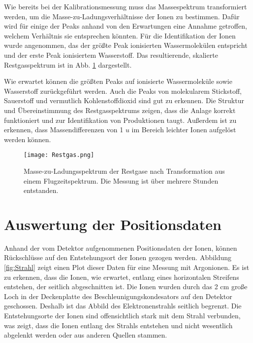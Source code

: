 Wie bereits bei der Kalibrationsmessung muss das Massespektrum transformiert werden, um die Masse-zu-Ladungsverhältnisse der Ionen zu bestimmen. Dafür wird für einige der Peaks anhand von den Erwartungen eine Annahme getroffen, welchem Verhältnis sie entsprechen könnten. Für die Identifikation der Ionen wurde angenommen, das der größte Peak ionisierten Wassermolekülen
entspricht und der erste Peak ionisiertem Wasserstoff. Das resultierende, skalierte Restgasspektrum ist in Abb. \ref{fig:rest} dargestellt.

Wie erwartet können die größten Peaks auf ionisierte Wassermoleküle sowie Wasserstoff zurückgeführt werden. Auch die Peaks von molekularem Stickstoff, Sauerstoff und vermutlich Kohlenstoffdioxid sind gut zu erkennen. Die Struktur und Übereinstimmung des Restgasspektrums zeigen, dass die Anlage korrekt funktioniert und zur Identifikation von Produktionen taugt. Außerdem ist zu erkennen, dass Massendifferenzen von 1 $u$ im Bereich leichter Ionen aufgelöst werden können. 

\begin{figure}[h]
    \centering
    \hspace*{-1cm}
    \texttt{[image: Restgas.png]}
    \caption[Masse-zu-Ladungsspektrum der Restgase]{Masse-zu-Ladungsspektrum der Restgase nach Transformation aus einem Flugzeitspektrum. Die Messung ist über mehrere Stunden entstanden.}
    \label{fig:rest}
\end{figure}

\section{Auswertung der Positionsdaten}
Anhand der vom Detektor aufgenommenen Positionsdaten der Ionen, können Rückschlüsse auf den Entstehungsort der Ionen gezogen werden. Abbildung \ref{fig:Strahl} zeigt einen Plot dieser Daten für eine Messung mit Argonionen. Es ist zu erkennen, dass die Ionen, wie erwartet, entlang eines horizontalen Streifens entstehen, der seitlich abgeschnitten ist. Die Ionen wurden durch das 2 cm große Loch in der Deckenplatte des Beschleunigungskondesators auf den Detektor geschossen. Deshalb ist das Abbild des Elektronenstrahls seitlich begrenzt. Die Entstehungsorte der Ionen sind offensichtlich stark mit dem Strahl verbunden, was zeigt, dass die Ionen entlang des Strahls entstehen und nicht wesentlich abgelenkt werden oder aus anderen Quellen stammen.


